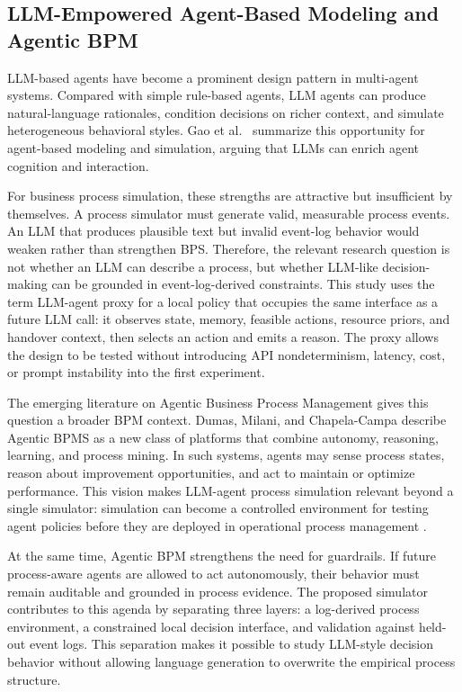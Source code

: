 \subsection{LLM-Empowered Agent-Based Modeling and Agentic
BPM}\label{llm-empowered-agent-based-modeling-and-agentic-bpm}

LLM-based agents have become a prominent design pattern in multi-agent
systems. Compared with simple rule-based agents, LLM agents can produce
natural-language rationales, condition decisions on richer context, and
simulate heterogeneous behavioral styles. Gao et al.~\cite{gao2024llmabm} summarize
this opportunity for agent-based modeling and simulation, arguing that
LLMs can enrich agent cognition and interaction.

For business process simulation, these strengths are attractive but
insufficient by themselves. A process simulator must generate valid,
measurable process events. An LLM that produces plausible text but
invalid event-log behavior would weaken rather than strengthen BPS.
Therefore, the relevant research question is not whether an LLM can
describe a process, but whether LLM-like decision-making can be grounded
in event-log-derived constraints. This study uses the term LLM-agent
proxy for a local policy that occupies the same interface as a future
LLM call: it observes state, memory, feasible actions, resource priors,
and handover context, then selects an action and emits a reason. The
proxy allows the design to be tested without introducing API
nondeterminism, latency, cost, or prompt instability into the first
experiment.

The emerging literature on Agentic Business Process Management gives
this question a broader BPM context. Dumas, Milani, and Chapela-Campa
describe Agentic BPMS as a new class of platforms that combine
autonomy, reasoning, learning, and process mining. In such systems,
agents may sense process states, reason about improvement opportunities,
and act to maintain or optimize performance. This vision makes LLM-agent
process simulation relevant beyond a single simulator: simulation can
become a controlled environment for testing agent policies before they
are deployed in operational process management \cite{dumas2026agenticbpms}.

At the same time, Agentic BPM strengthens the need for guardrails. If
future process-aware agents are allowed to act autonomously, their
behavior must remain auditable and grounded in process evidence. The
proposed simulator contributes to this agenda by separating three
layers: a log-derived process environment, a constrained local decision
interface, and validation against held-out event logs. This separation
makes it possible to study LLM-style decision behavior without allowing
language generation to overwrite the empirical process structure.

